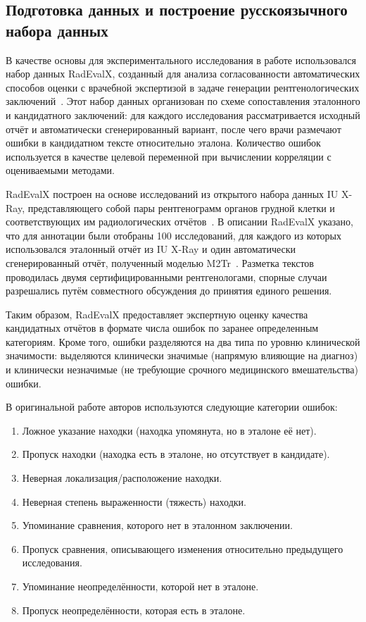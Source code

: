 \subsection{Подготовка данных и построение русскоязычного набора данных}

В качестве основы для экспериментального исследования в работе использовался набор данных RadEvalX, созданный для анализа согласованности автоматических способов оценки с врачебной экспертизой в задаче генерации рентгенологических заключений~\cite{calamida2024radiology,calamida2023radiologyaware}. Этот набор данных организован по схеме сопоставления эталонного и кандидатного заключений: для каждого исследования рассматривается исходный отчёт и автоматически сгенерированный вариант, после чего врачи размечают ошибки в кандидатном тексте относительно эталона. Количество ошибок используется в качестве целевой переменной при вычислении корреляции с оцениваемыми методами.

RadEvalX построен на основе исследований из открытого набора данных IU X-Ray, представляющего собой пары рентгенограмм органов грудной клетки и соответствующих им радиологических отчётов~\cite{demnerfushman2016preparing}. В описании RadEvalX указано, что для аннотации были отобраны 100 исследований, для каждого из которых использовался эталонный отчёт из IU X-Ray и один автоматически сгенерированный отчёт, полученный моделью M2Tr~\cite{pmlr-v158-endo21a}. Разметка текстов проводилась двумя сертифицированными рентгенологами, спорные случаи разрешались путём совместного обсуждения до принятия единого решения. 

Таким образом, RadEvalX предоставляет экспертную оценку качества кандидатных отчётов в формате числа ошибок по заранее определенным категориям. Кроме того, ошибки разделяются на два типа по уровню клинической значимости: выделяются клинически значимые (напрямую влияющие на диагноз) и клинически незначимые (не требующие срочного медицинского вмешательства) ошибки.

В оригинальной работе авторов используются следующие категории ошибок:
\begin{enumerate}
    \item Ложное указание находки (находка упомянута, но в эталоне её нет).
    \item Пропуск находки (находка есть в эталоне, но отсутствует в кандидате).
    \item Неверная локализация/расположение находки.
    \item Неверная степень выраженности (тяжесть) находки.
    \item Упоминание сравнения, которого нет в эталонном заключении.
    \item Пропуск сравнения, описывающего изменения относительно предыдущего исследования.
    \item Упоминание неопределённости, которой нет в эталоне.
    \item Пропуск неопределённости, которая есть в эталоне.
\end{enumerate}

